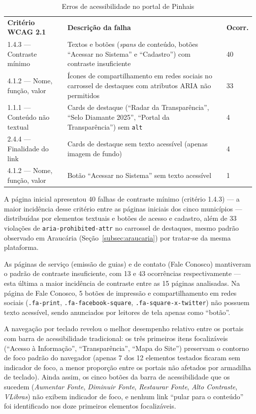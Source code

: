 \documentclass[brazil]{ifpr-pinhais}
\begin{document}
\begin{table}[htb]
\caption{Erros de acessibilidade no portal de Pinhais}
\label{tab:pinhais}
\begin{tabular}{p{3.8cm} p{7cm} p{1.5cm}}
\rowcolor{headerblue}
\color{white}\textbf{Critério WCAG 2.1} & \color{white}\textbf{Descrição da falha} & \color{white}\textbf{Ocorr.} \\
1.4.3 --- Contraste mínimo    & Textos e botões (\textit{spans} de conteúdo, botões ``Acessar no Sistema'' e ``Cadastro'') com contraste insuficiente & 40 \\
4.1.2 --- Nome, função, valor & Ícones de compartilhamento em redes sociais no carrossel de destaques com atributos ARIA não permitidos & 33 \\
1.1.1 --- Conteúdo não textual & Cards de destaque (``Radar da Transparência'', ``Selo Diamante 2025'', ``Portal da Transparência'') sem \texttt{alt} & 4 \\
2.4.4 --- Finalidade do link  & Cards de destaque sem texto acessível (apenas imagem de fundo) & 4 \\
4.1.2 --- Nome, função, valor & Botão ``Acessar no Sistema'' sem texto acessível & 1 \\
\end{tabular}
\end{table}

A página inicial apresentou 40 falhas de contraste mínimo (critério 1.4.3) --- a maior incidência desse critério entre as páginas iniciais dos cinco municípios --- distribuídas por elementos textuais e botões de acesso e cadastro, além de 33 violações de \texttt{aria-prohibited-attr} no carrossel de destaques, mesmo padrão observado em Araucária (Seção~\ref{subsec:araucaria}) por tratar-se da mesma plataforma.

As páginas de serviço (emissão de guias) e de contato (Fale Conosco) mantiveram o padrão de contraste insuficiente, com 13 e 43 ocorrências respectivamente --- esta última a maior incidência de contraste entre as 15 páginas analisadas. Na página de Fale Conosco, 5 botões de impressão e compartilhamento em redes sociais (\texttt{.fa-print}, \texttt{.fa-facebook-square}, \texttt{.fa-square-x-twitter}) não possuem texto acessível, sendo anunciados por leitores de tela apenas como ``botão''.

A navegação por teclado revelou o melhor desempenho relativo entre os portais com barra de acessibilidade tradicional: os três primeiros itens focalizáveis (``Acesso à Informação'', ``Transparência'', ``Mapa do Site'') preservam o contorno de foco padrão do navegador (apenas 7 dos 12 elementos testados ficaram sem indicador de foco, a menor proporção entre os portais não afetados por armadilha de teclado). Ainda assim, os cinco botões da barra de acessibilidade que os sucedem (\textit{Aumentar Fonte}, \textit{Diminuir Fonte}, \textit{Restaurar Fonte}, \textit{Alto Contraste}, \textit{VLibras}) não exibem indicador de foco, e nenhum link ``pular para o conteúdo'' foi identificado nos doze primeiros elementos focalizáveis.
\end{document}
